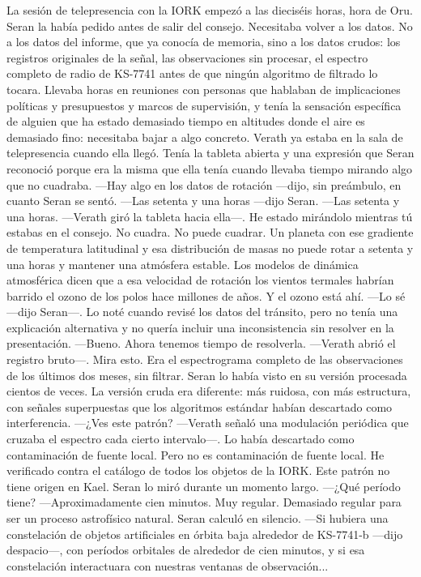 \documentclass[11pt,a5paper,twoside]{book}
\begin{document}
La sesión de telepresencia con la IORK empezó a las dieciséis horas, hora de Oru.
Seran la había pedido antes de salir del consejo. Necesitaba volver a los datos. No a los datos del informe, que ya conocía de memoria, sino a los datos crudos: los registros originales de la señal, las observaciones sin procesar, el espectro completo de radio de KS-7741 antes de que ningún algoritmo de filtrado lo tocara. Llevaba horas en reuniones con personas que hablaban de implicaciones políticas y presupuestos y marcos de supervisión, y tenía la sensación específica de alguien que ha estado demasiado tiempo en altitudes donde el aire es demasiado fino: necesitaba bajar a algo concreto.
Verath ya estaba en la sala de telepresencia cuando ella llegó. Tenía la tableta abierta y una expresión que Seran reconoció porque era la misma que ella tenía cuando llevaba tiempo mirando algo que no cuadraba.
—Hay algo en los datos de rotación —dijo, sin preámbulo, en cuanto Seran se sentó.
—Las setenta y una horas —dijo Seran.
—Las setenta y una horas. —Verath giró la tableta hacia ella—. He estado mirándolo mientras tú estabas en el consejo. No cuadra. No puede cuadrar. Un planeta con ese gradiente de temperatura latitudinal y esa distribución de masas no puede rotar a setenta y una horas y mantener una atmósfera estable. Los modelos de dinámica atmosférica dicen que a esa velocidad de rotación los vientos termales habrían barrido el ozono de los polos hace millones de años. Y el ozono está ahí.
—Lo sé —dijo Seran—. Lo noté cuando revisé los datos del tránsito, pero no tenía una explicación alternativa y no quería incluir una inconsistencia sin resolver en la presentación.
—Bueno. Ahora tenemos tiempo de resolverla. —Verath abrió el registro bruto—. Mira esto.
Era el espectrograma completo de las observaciones de los últimos dos meses, sin filtrar. Seran lo había visto en su versión procesada cientos de veces. La versión cruda era diferente: más ruidosa, con más estructura, con señales superpuestas que los algoritmos estándar habían descartado como interferencia.
—¿Ves este patrón? —Verath señaló una modulación periódica que cruzaba el espectro cada cierto intervalo—. Lo había descartado como contaminación de fuente local. Pero no es contaminación de fuente local. He verificado contra el catálogo de todos los objetos de la IORK. Este patrón no tiene origen en Kael.
Seran lo miró durante un momento largo.
—¿Qué período tiene?
—Aproximadamente cien minutos. Muy regular. Demasiado regular para ser un proceso astrofísico natural.
Seran calculó en silencio.
—Si hubiera una constelación de objetos artificiales en órbita baja alrededor de KS-7741-b —dijo despacio—, con períodos orbitales de alrededor de cien minutos, y si esa constelación interactuara con nuestras ventanas de observación...
\end{document}
